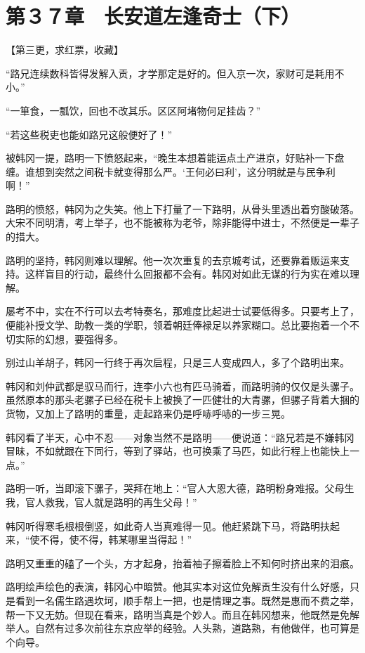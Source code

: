 \section{第３７章　长安道左逢奇士（下）}

【第三更，求红票，收藏】

“路兄连续数科皆得发解入贡，才学那定是好的。但入京一次，家财可是耗用不小。”

“一箪食，一瓢饮，回也不改其乐。区区阿堵物何足挂齿？”

“若这些税吏也能如路兄这般便好了！”

被韩冈一提，路明一下愤怒起来，“晚生本想着能运点土产进京，好贴补一下盘缠。谁想到突然之间税卡就变得那么严。‘王何必曰利’，这分明就是与民争利啊！”

路明的愤怒，韩冈为之失笑。他上下打量了一下路明，从骨头里透出着穷酸破落。大宋不同明清，考上举子，也不能被称为老爷，除非能得中进士，不然便是一辈子的措大。

路明的坚持，韩冈则难以理解。他一次次重复的去京城考试，还要靠着贩运来支持。这样盲目的行动，最终什么回报都不会有。韩冈对如此无谋的行为实在难以理解。

屡考不中，实在不行可以去考特奏名，那难度比起进士试要低得多。只要考上了，便能补授文学、助教一类的学职，领着朝廷俸禄足以养家糊口。总比要抱着一个不切实际的幻想，要强得多。

别过山羊胡子，韩冈一行终于再次启程，只是三人变成四人，多了个路明出来。

韩冈和刘仲武都是驭马而行，连李小六也有匹马骑着，而路明骑的仅仅是头骡子。虽然原本的那头老骡子已经在税卡上被换了一匹健壮的大青骡，但骡子背着大捆的货物，又加上了路明的重量，走起路来仍是呼哧呼哧的一步三晃。

韩冈看了半天，心中不忍——对象当然不是路明——便说道：“路兄若是不嫌韩冈冒昧，不如就跟在下同行，等到了驿站，也可换乘了马匹，如此行程上也能快上一点。”

路明一听，当即滚下骡子，哭拜在地上：“官人大恩大德，路明粉身难报。父母生我，官人救我，官人就是路明的再生父母！”

韩冈听得寒毛根根倒竖，如此奇人当真难得一见。他赶紧跳下马，将路明扶起来，“使不得，使不得，韩某哪里当得起！”

路明又重重的磕了一个头，方才起身，抬着袖子擦着脸上不知何时挤出来的泪痕。

路明绘声绘色的表演，韩冈心中暗赞。他其实本对这位免解贡生没有什么好感，只是看到一名儒生路遇坎坷，顺手帮上一把，也是情理之事。既然是惠而不费之举，帮一下又无妨。但现在看来，路明当真是个妙人。而且在韩冈想来，他既然是免解举人。自然有过多次前往东京应举的经验。人头熟，道路熟，有他做伴，也可算是个向导。


